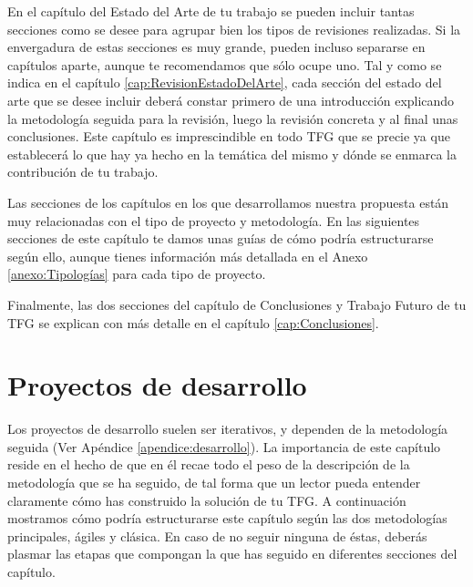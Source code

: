En el capítulo del Estado del Arte de tu trabajo se pueden incluir tantas secciones como se desee para agrupar bien los tipos de revisiones realizadas. Si la envergadura de estas secciones es muy grande, pueden incluso separarse en capítulos aparte, aunque te recomendamos que sólo ocupe uno. Tal y como se indica en el capítulo \ref{cap:RevisionEstadoDelArte}, cada sección del estado del arte que se desee incluir deberá constar primero de una introducción explicando la metodología seguida para la revisión, luego la revisión concreta y al final unas conclusiones. Este capítulo es imprescindible en todo TFG que se precie ya que establecerá lo que hay ya hecho en la temática del mismo y dónde se enmarca la contribución de tu trabajo.


Las secciones de los capítulos en los que desarrollamos nuestra propuesta están muy relacionadas con el tipo de proyecto y metodología. En las siguientes secciones de este capítulo te damos unas guías de cómo podría estructurarse según ello, aunque tienes información más detallada en el Anexo \ref{anexo:Tipologías} para cada tipo de proyecto.

Finalmente, las dos secciones del capítulo de Conclusiones y Trabajo Futuro de tu TFG se explican con más detalle en el capítulo \ref{cap:Conclusiones}.

\section{Proyectos de desarrollo}

Los proyectos de desarrollo suelen ser iterativos, y dependen de la metodología seguida (Ver Apéndice \ref{apendice:desarrollo}). La importancia de este capítulo reside en el hecho de que en él recae todo el peso de la descripción de la metodología que se ha seguido, de tal forma que un lector pueda entender claramente cómo has construido la solución de tu TFG. A continuación mostramos cómo podría estructurarse este capítulo según las dos  metodologías principales, ágiles y clásica. En caso de no seguir ninguna de éstas, deberás plasmar las etapas que compongan la que has seguido en diferentes secciones del capítulo. 

